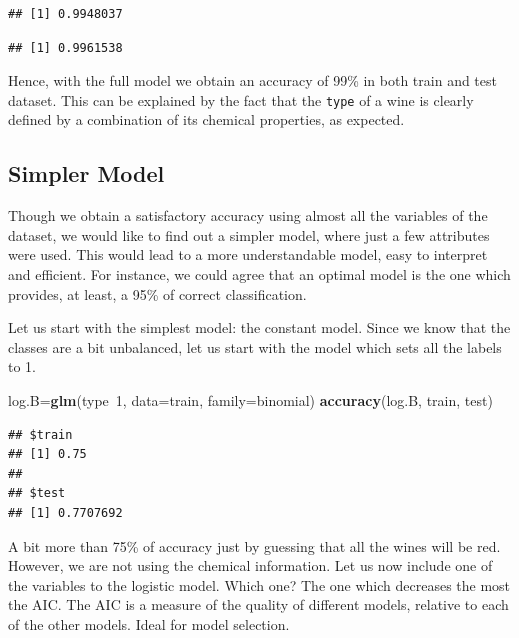 \documentclass[12pt,]{article}
\newenvironment{Shaded}{\begin{snugshade}}{\end{snugshade}}
\newcommand{\KeywordTok}[1]{\textcolor[rgb]{0.13,0.29,0.53}{\textbf{{#1}}}}
\newcommand{\DataTypeTok}[1]{\textcolor[rgb]{0.13,0.29,0.53}{{#1}}}
\newcommand{\DecValTok}[1]{\textcolor[rgb]{0.00,0.00,0.81}{{#1}}}
\newcommand{\NormalTok}[1]{{#1}}
\begin{document}
\begin{verbatim}
## [1] 0.9948037
\end{verbatim}

\begin{Shaded}
\end{Shaded}

\begin{verbatim}
## [1] 0.9961538
\end{verbatim}

Hence, with the full model we obtain an accuracy of 99\% in both train
and test dataset. This can be explained by the fact that the
\texttt{type} of a wine is clearly defined by a combination of its
chemical properties, as expected.

\subsection{Simpler Model}\label{simpler-model}

Though we obtain a satisfactory accuracy using almost all the variables
of the dataset, we would like to find out a simpler model, where just a
few attributes were used. This would lead to a more understandable
model, easy to interpret and efficient. For instance, we could agree
that an optimal model is the one which provides, at least, a 95\% of
correct classification.

Let us start with the simplest model: the constant model. Since we know
that the classes are a bit unbalanced, let us start with the model which
sets all the labels to 1.

\begin{Shaded}
\begin{Highlighting}[]
\NormalTok{log.B=}\KeywordTok{glm}\NormalTok{(type~}\DecValTok{1}\NormalTok{, }\DataTypeTok{data=}\NormalTok{train, }\DataTypeTok{family=}\NormalTok{binomial)}
\KeywordTok{accuracy}\NormalTok{(log.B, train, test)}
\end{Highlighting}
\end{Shaded}

\begin{verbatim}
## $train
## [1] 0.75
## 
## $test
## [1] 0.7707692
\end{verbatim}

A bit more than 75\% of accuracy just by guessing that all the wines
will be red. However, we are not using the chemical information. Let us
now include one of the variables to the logistic model. Which one? The
one which decreases the most the AIC. The AIC is a measure of the
quality of different models, relative to each of the other models. Ideal
for model selection.
\end{document}
